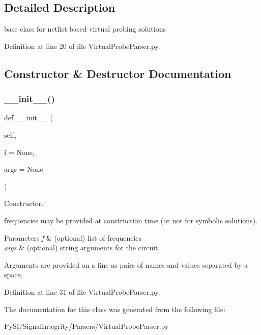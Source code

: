\subsection{Detailed Description}
base class for netlist based virtual probing solutions 

Definition at line 20 of file Virtual\+Probe\+Parser.\+py.



\subsection{Constructor \& Destructor Documentation}
\mbox{\label{classSignalIntegrity_1_1Parsers_1_1VirtualProbeParser_1_1VirtualProbeParser_af9856388f7022892c3159ad55872a27e}} 
\subsubsection{\texorpdfstring{\+\_\+\+\_\+init\+\_\+\+\_\+()}{\_\_init\_\_()}}
{\footnotesize\ttfamily def \+\_\+\+\_\+init\+\_\+\+\_\+ (\begin{DoxyParamCaption}\item[{}]{self,  }\item[{}]{f = {\ttfamily None},  }\item[{}]{args = {\ttfamily None} }\end{DoxyParamCaption})}



Constructor. 

frequencies may be provided at construction time (or not for symbolic solutions).


\begin{DoxyParams}{Parameters}
{\em f} & (optional) list of frequencies \\
\hline
{\em args} & (optional) string arguments for the circuit.\\
\hline
\end{DoxyParams}
Arguments are provided on a line as pairs of names and values separated by a space. 

Definition at line 31 of file Virtual\+Probe\+Parser.\+py.



The documentation for this class was generated from the following file\+:\begin{DoxyCompactItemize}
\item 
Py\+S\+I/\+Signal\+Integrity/\+Parsers/Virtual\+Probe\+Parser.\+py\end{DoxyCompactItemize}
